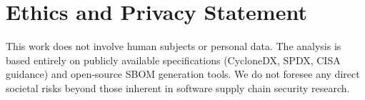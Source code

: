 \documentclass[sigconf, review, anonymous]{acmart}
\begin{document}
\section*{Ethics and Privacy Statement}
This work does not involve human subjects or personal data. The analysis is based entirely on publicly available specifications (CycloneDX, SPDX, CISA guidance) and open‑source SBOM generation tools. We do not foresee any direct societal risks beyond those inherent in software supply chain security research.




\appendix

\end{document}
